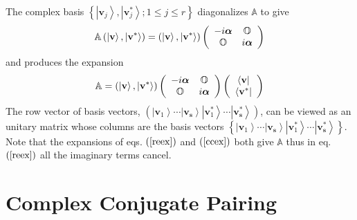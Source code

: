 \documentclass[aps,preprint]{revtex4}%
\begin{document}
The complex basis $\left\{  \left\vert \mathbf{v}_{j}\right\rangle ,\left\vert
\mathbf{v}_{j}^{\ast}\right\rangle ;1\leq j\leq r\right\}  $ diagonalizes
$\mathbb{A}$ to give
\begin{equation}
\mathbb{A}\left(  \left\vert \mathbf{v}\right\rangle ,\left\vert
\mathbf{v}^{\ast}\right\rangle \right)  =\left(  \left\vert \mathbf{v}%
\right\rangle ,\left\vert \mathbf{v}^{\ast}\right\rangle \right)  \left(
\begin{array}
[c]{cc}%
-i\boldsymbol{\alpha} & \mathbb{O}\\
\mathbb{O} & i\boldsymbol{\alpha}
\end{array}
\right)
\end{equation}
and produces the expansion%
\begin{equation}
\mathbb{A}=\left(  \left\vert \mathbf{v}\right\rangle ,\left\vert
\mathbf{v}^{\ast}\right\rangle \right)  \left(
\begin{array}
[c]{cc}%
-i\boldsymbol{\alpha} & \mathbb{O}\\
\mathbb{O} & i\boldsymbol{\alpha}
\end{array}
\right)  \left(
\begin{array}
[c]{c}%
\left\langle \mathbf{v}\right\vert \\
\left\langle \mathbf{v}^{\ast}\right\vert
\end{array}
\right)  \label{ccex}%
\end{equation}
The row vector of basis vectors, $\left(  \left\vert \mathbf{v}_{1}%
\right\rangle \cdots\left\vert \mathbf{v}_{\mathbf{s}}\right\rangle \left\vert
\mathbf{v}_{1}^{\ast}\right\rangle \cdots\left\vert \mathbf{v}_{\mathbf{s}%
}^{\ast}\right\rangle \right)  $, can be viewed as an unitary matrix whose
columns are the basis vectors $\left\{  \left\vert \mathbf{v}_{1}\right\rangle
\cdots\left\vert \mathbf{v}_{\mathbf{s}}\right\rangle \left\vert
\mathbf{v}_{1}^{\ast}\right\rangle \cdots\left\vert \mathbf{v}_{\mathbf{s}%
}^{\ast}\right\rangle \right\}  $. Note that the expansions of eqs. $\left(
\ref{reex}\right)  $ and $\left(  \ref{ccex}\right)  $ both give $\mathbb{A}$
thus in eq. $\left(  \ref{reex}\right)  $ all the imaginary terms cancel.

\section{Complex Conjugate Pairing\label{pairing}}
\end{document}
